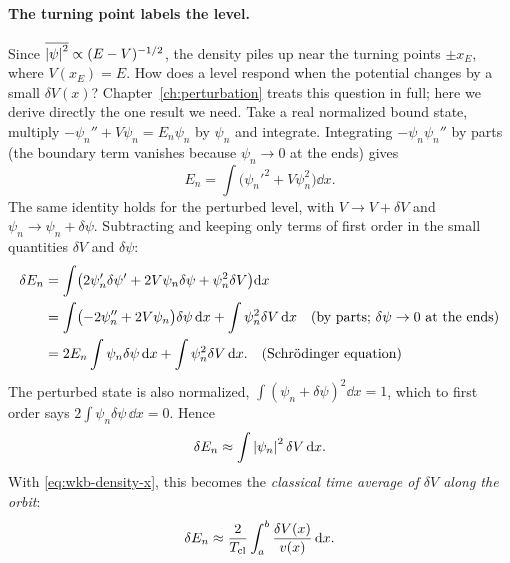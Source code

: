 \paragraph{The turning point labels the level.} Since $\overline{\left\lvert \psi\right\rvert^2}\propto(E-V)^{-1/2}$, the density piles up near the turning points $\pm x_E$, where $V(x_E)=E$. How does a level respond when the potential changes by a small $\delta V(x)$? Chapter~\ref{ch:perturbation} treats this question in full; here we derive directly the one result we need. Take a real normalized bound state, multiply $-\psi_n''+V\psi_n=E_n\psi_n$ by $\psi_n$ and integrate. Integrating $-\psi_n\psi_n''$ by parts (the boundary term vanishes because $\psi_n\to0$ at the ends) gives
\begin{equation}
E_n=\int\bigl(\psi_n'^2+V\psi_n^2\bigr)\dd x .
\end{equation}
The same identity holds for the perturbed level, with $V\to V+\delta V$ and $\psi_n\to\psi_n+\delta\psi$. Subtracting and keeping only terms of first order in the small quantities $\delta V$ and $\delta\psi$:
\begin{align}
\delta E_n&=\int\bigl(2\psi_n'\delta\psi'+2V\psi_n\delta\psi+\psi_n^2\delta V\bigr)\mathrm{d} x\notag\\
&=\int\bigl(-2\psi_n''+2V\psi_n\bigr)\delta\psi\,\mathrm{d} x+\int\psi_n^2\delta V\,\mathrm{d} x\quad\text{(by parts; }\delta\psi\to0\text{ at the ends)}\notag\\
&=2E_n\int\psi_n\delta\psi\,\mathrm{d} x+\int\psi_n^2\delta V\,\mathrm{d} x .\quad\text{(Schr\"odinger equation)}
\end{align}
The perturbed state is also normalized, $\int(\psi_n+\delta\psi)^2\dd x=1$, which to first order says $2\int\psi_n\delta\psi\,\dd x=0$. Hence
\begin{equation}
\delta E_n\approx\int\left\lvert \psi_n\right\rvert^2\delta V\,\mathrm{d} x .
\label{eq:wkb-firstorder}
\end{equation}
With \cref{eq:wkb-density-x}, this becomes the \emph{classical time average of $\delta V$ along the orbit}:
\begin{equation}
\delta E_n\approx\frac{2}{T_{\rm cl}}\int_a^b\frac{\delta V(x)}{v(x)}\,\mathrm{d} x .
\label{eq:wkb-timeavg}
\end{equation}
